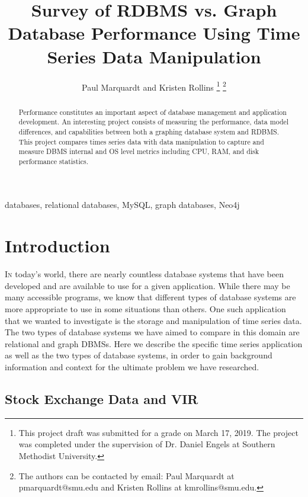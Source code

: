 \documentclass{IEEEtran}
\begin{document}
	
\title{Survey of RDBMS vs. Graph Database Performance Using Time Series Data Manipulation}
\author{Paul Marquardt and Kristen Rollins 
\thanks{This project draft was submitted for a grade on March 17, 2019. The project was completed under the supervision of Dr. Daniel Engels at Southern Methodist University.} 
\thanks{The authors can be contacted by email: Paul Marquardt at pmarquardt@smu.edu and Kristen Rollins at kmrollins@smu.edu.}}

\maketitle

\begin{abstract}
Performance constitutes an important aspect of database management and application development. An interesting project consists of measuring the performance, data model differences, and capabilities between both a graphing database system and RDBMS. This project compares times series data with data manipulation to capture and measure DBMS internal and OS level metrics including CPU, RAM, and disk performance statistics. 
\end{abstract}

\begin{IEEEkeywords}
	databases, relational databases, MySQL, graph databases, Neo4j
\end{IEEEkeywords}


\section{Introduction}

\lettrine{I}{n} today’s world, there are nearly countless database systems that have been developed and are available to use for a given application. While there may be many accessible programs, we know that different types of database systems are more appropriate to use in some situations than others. One such application that we wanted to investigate is the storage and manipulation of time series data.  The two types of database systems we have aimed to compare in this domain are relational and graph DBMSs. Here we describe the specific time series application as well as the two types of database systems, in order to gain background information and context for the ultimate problem we have researched.   

\subsection{Stock Exchange Data and VIR}
\end{document}
